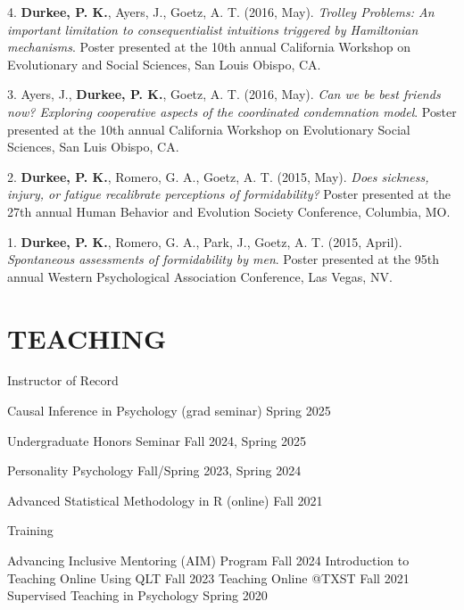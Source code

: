 \documentclass[10pt,]{article}
\begin{document}
4. \hangindent=0.5in \textbf{Durkee, P. K.}, Ayers, J., Goetz, A. T.
(2016, May). \emph{Trolley Problems: An important limitation to
consequentialist intuitions triggered by Hamiltonian mechanisms}. Poster
presented at the 10th annual California Workshop on Evolutionary and
Social Sciences, San Louis Obispo, CA.

3. \hangindent=0.5in Ayers, J., \textbf{Durkee, P. K.}, Goetz, A. T.
(2016, May). \emph{Can we be best friends now? Exploring cooperative
aspects of the coordinated condemnation model}. Poster presented at the
10th annual California Workshop on Evolutionary Social Sciences, San
Luis Obispo, CA.

2. \hangindent=0.5in \textbf{Durkee, P. K.}, Romero, G. A., Goetz, A. T.
(2015, May). \emph{Does sickness, injury, or fatigue recalibrate
perceptions of formidability?} Poster presented at the 27th annual Human
Behavior and Evolution Society Conference, Columbia, MO.

1. \hangindent=0.5in \textbf{Durkee, P. K.}, Romero, G. A., Park, J.,
Goetz, A. T. (2015, April). \emph{Spontaneous assessments of
formidability by men}. Poster presented at the 95th annual Western
Psychological Association Conference, Las Vegas, NV.

\section{TEACHING}\label{teaching}

\textcolor{light-gray}{Instructor of Record}

Causal Inference in Psychology (grad seminar)
\hfill \textcolor{light-gray}{Spring 2025}

Undergraduate Honors Seminar
\hfill \textcolor{light-gray}{Fall 2024, Spring 2025}

Personality Psychology
\hfill \textcolor{light-gray}{Fall/Spring 2023, Spring 2024}

Advanced Statistical Methodology in R (online)
\hfill \textcolor{light-gray}{Fall 2021}

\textcolor{light-gray}{Training}

Advancing Inclusive Mentoring (AIM) Program
\hfill \textcolor{light-gray}{Fall 2024} \newline Introduction to
Teaching Online Using QLT \hfill \textcolor{light-gray}{Fall 2023}
\newline Teaching Online @TXST \hfill \textcolor{light-gray}{Fall 2021}
\newline Supervised Teaching in Psychology
\hfill \textcolor{light-gray}{Spring 2020}
\end{document}
